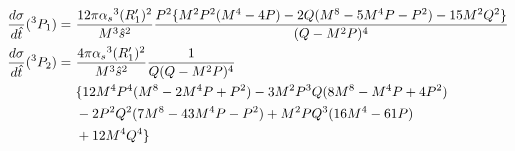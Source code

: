 \documentclass[aps,prc,preprint,superscriptaddress,showpacs,showkeys,amsmath]{revtex4-1}
\begin{document}
\begin{itemize}
\begin{equation}
\begin{split}
\frac{d\sigma}{d{\hat{t}}}(^3P_1) = ~&\frac{12\pi {\alpha_{s}}^3 (R_{1}^\prime)^{2}}{M^3{\hat{s}}^2}\frac{P^2\{M^2P^2(M^4-4P)-2Q(M^8-5M^4P-P^2)-15M^2Q^2\}}{(Q-M^2P)^4}\\
\frac{d\sigma}{d{\hat{t}}}(^3P_2) = ~&\frac{4\pi {\alpha_{s}}^3 (R_{1}^\prime)^{2}}{M^3{\hat{s}}^2}\frac{1}{Q(Q-M^2P)^4}\\
                             ~&\{12M^4P^4(M^8-2M^4P+P^2) - 3M^2P^3Q(8M^8-M^4P+4P^2)\\
                             ~&-2P^2Q^2(7M^8-43M^4P-P^2)+M^2PQ^3(16M^4-61P)\\
                             ~&+12M^4Q^4\}
\end{split}  
\end{equation}
\end{itemize}
\end{document}
